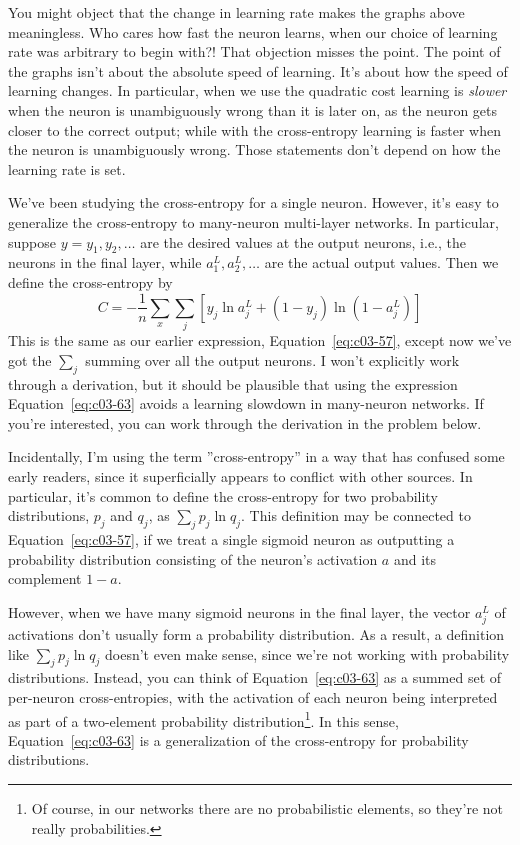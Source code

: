 You might object that the change in learning rate makes the graphs above meaningless. Who cares how fast the neuron learns, when our choice of learning rate was arbitrary to begin with?! That objection misses the point. The point of the graphs isn't about the absolute speed of learning. It's about how the speed of learning changes. In particular, when we use the quadratic cost learning is \textit{slower} when the neuron is unambiguously wrong than it is later on, as the neuron gets closer to the correct output; while with the cross-entropy learning is faster when the neuron is unambiguously wrong. Those statements don't depend on how the learning rate is set. 

We've been studying the cross-entropy for a single neuron. However, it's easy to generalize the cross-entropy to many-neuron multi-layer networks. In particular, suppose $y=y_{1}, y_{2}, \dots$ are the desired values at the output neurons, i.e., the neurons in the final layer, while $a_{1}^{L}, a_{2}^{L}, \dots$ are the actual output values. Then we define the cross-entropy by 
\begin{equation}
C=-\frac{1}{n} \sum_{x} \sum_{j}\left[y_{j} \ln a_{j}^{L}+\left(1-y_{j}\right) \ln \left(1-a_{j}^{L}\right)\right]
\label{eq:c03-63}
\end{equation}
This is the same as our earlier expression, Equation~\ref{eq:c03-57}, except now we've got the $\sum_{j}$ summing over all the output neurons. I won't explicitly work through a derivation, but it should be plausible that using the expression Equation~\ref{eq:c03-63} avoids a learning slowdown in many-neuron networks. If you're interested, you can work through the derivation in the problem below. 

Incidentally, I'm using the term ''cross-entropy'' in a way that has confused some early readers, since it superficially appears to conflict with other sources. In particular, it's common to define the cross-entropy for two probability distributions, $p_j$ and $q_j$, as $\sum_{j} p_{j} \ln q_{j}$. This definition may be connected to Equation~\ref{eq:c03-57}, if we treat a single sigmoid neuron as outputting a probability distribution consisting of the neuron's activation $a$ and its complement $1-a$.


However, when we have many sigmoid neurons in the final layer, the vector $a^L_j$
of activations don't usually form a probability distribution. As a result, a definition like $\sum_{j} p_{j} \ln q_{j}$ doesn't even make sense, since we're not working with probability distributions. Instead, you can think of Equation~\ref{eq:c03-63} as a summed set of per-neuron cross-entropies, with the activation of each neuron being interpreted as part of a two-element probability distribution\footnote{Of course, in our networks there are no probabilistic elements, so they're not really probabilities.}. In this sense, Equation~\ref{eq:c03-63} is a generalization of the cross-entropy for probability distributions.

